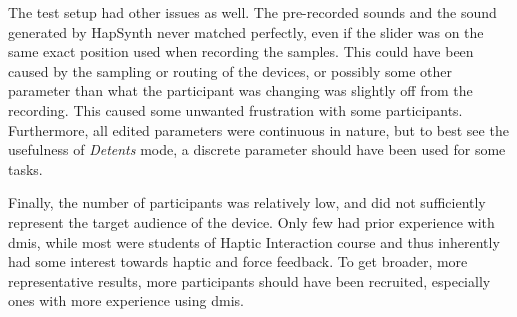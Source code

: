 The test setup had other issues as well. The pre-recorded sounds and the sound generated by HapSynth never matched perfectly, even if the slider was on the same exact position used when recording the samples. This could have been caused by the sampling or routing of the devices, or possibly some other parameter than what the participant was changing was slightly off from the recording. This caused some unwanted frustration with some participants. Furthermore, all edited parameters were continuous in nature, but to best see the usefulness of \textit{Detents} mode, a discrete parameter should have been used for some tasks.

Finally, the number of participants was relatively low, and did not sufficiently represent the target audience of the device. Only few had prior experience with \glspl{dmi}, while most were students of Haptic Interaction course and thus inherently had some interest towards haptic and force feedback. To get broader, more representative results, more participants should have been recruited, especially ones with more experience using \glspl{dmi}.
